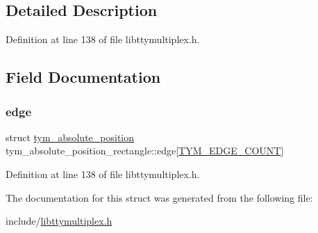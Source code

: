 \subsection{Detailed Description}


Definition at line 138 of file libttymultiplex.\+h.



\subsection{Field Documentation}
\mbox{\label{structtym__absolute__position__rectangle_a8ae5bbbd49e8293d8fa93df8d1572423}} 
\subsubsection{\texorpdfstring{edge}{edge}}
{\footnotesize\ttfamily struct \hyperlink{structtym__absolute__position}{tym\+\_\+absolute\+\_\+position} tym\+\_\+absolute\+\_\+position\+\_\+rectangle\+::edge\mbox{[}\hyperlink{libttymultiplex_8h_ad8856480bf629c72938051528100b834ac0bfa9550b58bc257ca09715d719de7f}{T\+Y\+M\+\_\+\+E\+D\+G\+E\+\_\+\+C\+O\+U\+NT}\mbox{]}}



Definition at line 138 of file libttymultiplex.\+h.



The documentation for this struct was generated from the following file\+:\begin{DoxyCompactItemize}
\item 
include/\hyperlink{libttymultiplex_8h}{libttymultiplex.\+h}\end{DoxyCompactItemize}

